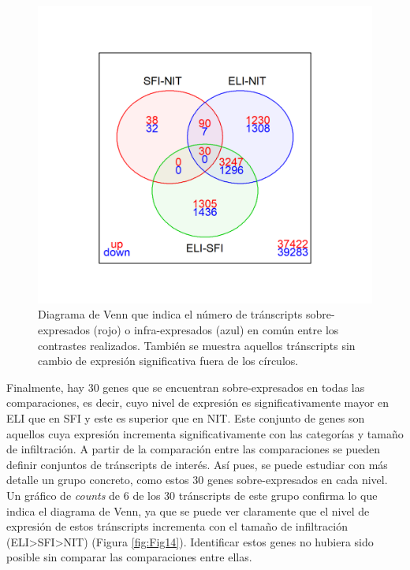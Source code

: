 \documentclass[
]{article}
\begin{document}
\begin{figure}

{\centering \includegraphics[width=0.8\linewidth]{results/5.CompComp/1.Venn} 

}

\caption{Diagrama de Venn que indica el número de tránscripts sobre-expresados (rojo) o infra-expresados (azul) en común entre los contrastes realizados. También se muestra aquellos tránscripts sin cambio de expresión significativa fuera de los círculos.}\label{fig:Fig13}
\end{figure}

Finalmente, hay 30 genes que se encuentran sobre-expresados en todas las
comparaciones, es decir, cuyo nivel de expresión es significativamente
mayor en ELI que en SFI y este es superior que en NIT. Este conjunto de
genes son aquellos cuya expresión incrementa significativamente con las
categorías y tamaño de infiltración. A partir de la comparación entre
las comparaciones se pueden definir conjuntos de tránscripts de interés.
Así pues, se puede estudiar con más detalle un grupo concreto, como
estos 30 genes sobre-expresados en cada nivel. Un gráfico de
\emph{counts} de 6 de los 30 tránscripts de este grupo confirma lo que
indica el diagrama de Venn, ya que se puede ver claramente que el nivel
de expresión de estos tránscripts incrementa con el tamaño de
infiltración (ELI\textgreater SFI\textgreater NIT) (Figura
\ref{fig:Fig14}). Identificar estos genes no hubiera sido posible sin
comparar las comparaciones entre ellas.
\end{document}

